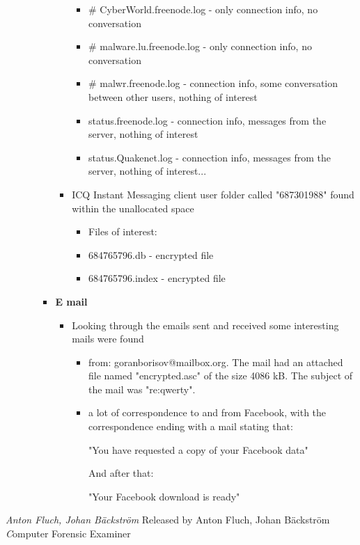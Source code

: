 \begin{enumerate}
\begin{itemize}
\begin{itemize}
\begin{itemize}
\begin{itemize}
		 		\item \# CyberWorld.freenode.log - only connection info, no conversation
		 		\item \# malware.lu.freenode.log - only connection info, no conversation
		 		\item \# malwr.freenode.log - connection info, some conversation between other users, nothing of interest
		 		\item status.freenode.log - connection info, messages from the server, nothing of interest
		 		\item status.Quakenet.log - connection info, messages from the server, nothing of interest...
		 	\end{itemize}
		 	
		 	\item ICQ Instant Messaging client user folder called "687301988" found within the unallocated space
		 	\begin{itemize}
		 		\item Files of interest: 
		 		\item 684765796.db - encrypted file
		 		\item 684765796.index - encrypted file
		 	\end{itemize}
		 	
		 \end{itemize}
		 
		 
		 
		 \item \textbf{E mail}
		 \begin{itemize}
		 		\item Looking through the emails sent and received some interesting mails were found
		 		 
		 		\begin{itemize}
		 			\item from: goranborisov@mailbox.org. The mail had an attached file named "encrypted.asc" of the size 4086 kB. The subject of the mail was "re:qwerty". 
		 			
		 			\item a lot of correspondence to and from Facebook, with the correspondence ending with a mail stating that:
		 			
		 			"You have requested a copy of your Facebook data"
		 			
		 			And after that:
		 			
		 			"Your Facebook download is ready"
		 			
		 		\end{itemize}
		 
		 
		 \end{itemize}
		
	\end{itemize}
	
		
	
\end{itemize}

\end{enumerate}

\noindent \textit{Anton Fluch, Johan Bäckström}	\hfill Released by {\wesa Anton Fluch, Johan Bäckström}\\
\textit Computer Forensic Examiner
\clearpage
